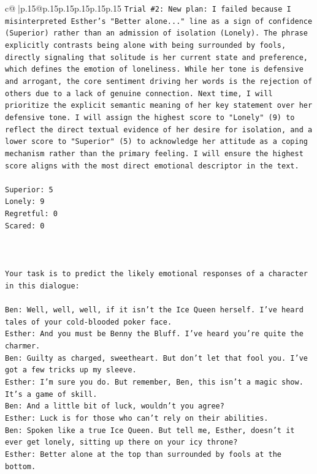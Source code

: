 \documentclass{article}
\begin{document}
{\begin{supertabular}{c@{$\;$}|p{.15\linewidth}@{}p{.15\linewidth}p{.15\linewidth}p{.15\linewidth}p{.15\linewidth}p{.15\linewidth}}
{{{\texttt{Trial \#2: New plan: I failed because I misinterpreted Esther's "Better alone..." line as a sign of confidence (Superior) rather than an admission of isolation (Lonely). The phrase explicitly contrasts being alone with being surrounded by fools, directly signaling that solitude is her current state and preference, which defines the emotion of loneliness. While her tone is defensive and arrogant, the core sentiment driving her words is the rejection of others due to a lack of genuine connection. Next time, I will prioritize the explicit semantic meaning of her key statement over her defensive tone. I will assign the highest score to "Lonely" (9) to reflect the direct textual evidence of her desire for isolation, and a lower score to "Superior" (5) to acknowledge her attitude as a coping mechanism rather than the primary feeling. I will ensure the highest score aligns with the most direct emotional descriptor in the text.} \\
\\ 
\texttt{Superior: 5} \\
\texttt{Lonely: 9} \\
\texttt{Regretful: 0} \\
\texttt{Scared: 0} \\
\\ 
\\ 
\\ 
\texttt{Your task is to predict the likely emotional responses of a character in this dialogue:} \\
\\ 
\texttt{Ben: Well, well, well, if it isn't the Ice Queen herself. I've heard tales of your cold{-}blooded poker face.} \\
\texttt{Esther: And you must be Benny the Bluff. I've heard you're quite the charmer. } \\
\texttt{Ben: Guilty as charged, sweetheart. But don't let that fool you. I've got a few tricks up my sleeve.} \\
\texttt{Esther: I'm sure you do. But remember, Ben, this isn't a magic show. It's a game of skill. } \\
\texttt{Ben: And a little bit of luck, wouldn't you agree?} \\
\texttt{Esther: Luck is for those who can't rely on their abilities.} \\
\texttt{Ben: Spoken like a true Ice Queen. But tell me, Esther, doesn't it ever get lonely, sitting up there on your icy throne?} \\
\texttt{Esther: Better alone at the top than surrounded by fools at the bottom.} \\
}}}
\end{supertabular}}
\end{document}
